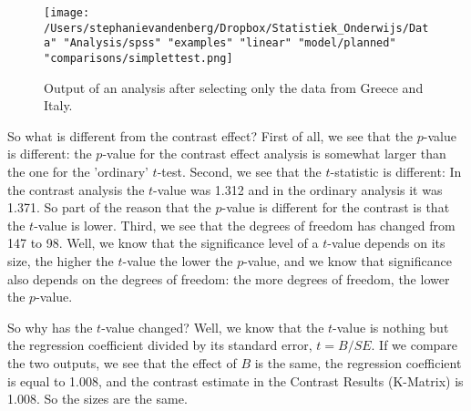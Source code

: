 \begin{figure}[h]
    \begin{center}
       \texttt{[image: /Users/stephanievandenberg/Dropbox/Statistiek\_Onderwijs/Data" "Analysis/spss" "examples" "linear" "model/planned" "comparisons/simplettest.png]}
    \end{center}
    \caption{Output of an analysis after selecting only the data from Greece and Italy.}
        \label{fig:simplettest}
\end{figure}

 

So what is different from the contrast effect? First of all, we see that the $p$-value is different: the $p$-value for the contrast effect analysis is somewhat larger than the one for the 'ordinary' $t$-test. Second, we see that the $t$-statistic is different: In the contrast analysis the $t$-value was 1.312 and in the ordinary analysis it was 1.371. So part of the reason that the $p$-value is different for the contrast is that the $t$-value is lower. Third, we see that the degrees of freedom has changed from 147 to 98. Well, we know that the significance level of a $t$-value depends on its size, the higher the $t$-value the lower the $p$-value, and we know that significance also depends on the degrees of freedom: the more degrees of freedom, the lower the $p$-value. 

So why has the $t$-value changed? Well, we know that the $t$-value is nothing but the regression coefficient divided by its standard error, $t=B/{SE}$. If we compare the two outputs, we see that the effect of $B$ is the same, the regression coefficient is equal to 1.008, and the contrast estimate in the Contrast Results (K-Matrix) is 1.008. So the sizes are the same. 

